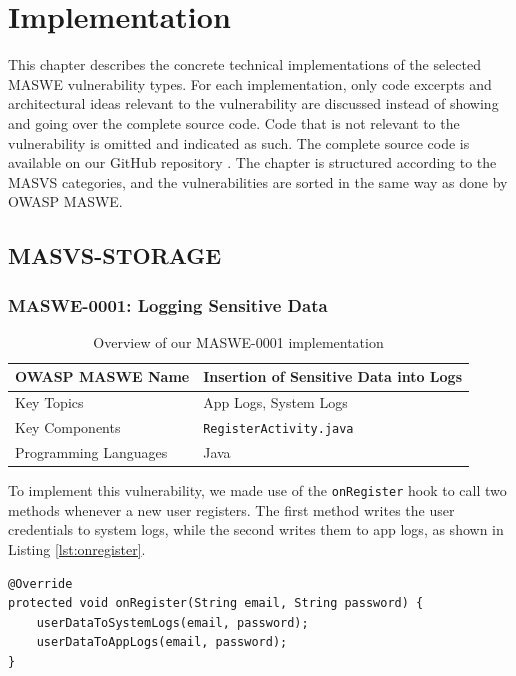 \chapter{Implementation}
\label{c:implementation}

This chapter describes the concrete technical implementations of the selected MASWE vulnerability types. For each implementation, only code excerpts and architectural ideas relevant to the vulnerability are discussed instead of showing and going over the complete source code. Code that is not relevant to the vulnerability is omitted and indicated as such. The complete source code is available on our GitHub repository \cite{ba_thesis_github_repository}. The chapter is structured according to the MASVS categories, and the vulnerabilities are sorted in the same way as done by OWASP MASWE.

\section{MASVS-STORAGE}

\subsection{MASWE-0001: Logging Sensitive Data}

\begin{table}[H]
\centering
\renewcommand{\arraystretch}{1.3}
\begin{tabular}{p{5cm} p{8cm} } 
\toprule
OWASP MASWE Name & Insertion of Sensitive Data into Logs \\ 
\midrule
Key Topics & App Logs, System Logs \\ 
Key Components & \texttt{RegisterActivity.java} \\
Programming Languages & Java \\ 
\bottomrule
\end{tabular}
\caption{Overview of our MASWE-0001 implementation}
\label{tab:maswe-0001}
\end{table}


To implement this vulnerability, we made use of the \texttt{onRegister} hook to call two methods whenever a new user registers. The first method writes the user credentials to system logs, while the second writes them to app logs, as shown in Listing \ref{lst:onregister}.

\begin{lstlisting}[style=JavaStyle, float=tbh, mathescape=true, captionpos=b, caption=User registration hook invoking logging of sensitive credentials, label=lst:onregister]
@Override
protected void onRegister(String email, String password) {
    userDataToSystemLogs(email, password);
    userDataToAppLogs(email, password);
}
\end{lstlisting}


